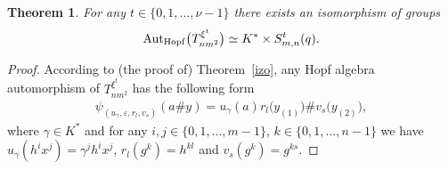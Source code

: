 \documentclass[pdftex]{sigma}
\numberwithin{equation}{section}
\newtheorem{Theorem}{Theorem}[section]
\begin{document}
\begin{Theorem}\label{graut} For any $t \in \{0, 1,\dots, \nu - 1\}$ there exists an isomorphism of groups
\begin{gather*}
{\rm Aut} _{\rm Hopf}\big(T_{nm^{2}}^ {\xi^{t}}\big) \simeq K^{*}\times S^{t}_{m, n}(q).
\end{gather*}
\end{Theorem}
\begin{proof} According to (the proof of) Theorem~\ref{izo}, any Hopf algebra automorphism of $T_{nm^{2}}^ {\xi^{t}}$ has the following form
\begin{gather*}
\psi_{(u_{\gamma}, \varepsilon, r_{l}, v_{s})}(a \# y) = u_{\gamma}(a) r_{l}\big(y_{(1)}\big) \# v_{s}\big(y_{(2)}\big),
\end{gather*}
where $\gamma \in K^{*}$ and for any $i, j \in \{0, 1,\dots, m-1\}$, $k \in \{0, 1,\dots, n-1\}$ we have $u_{\gamma}(h^{i}x^{j}) = \gamma^{j}h^{i}x^{j}$, $r_{l}(g^{k}) = h^{kl}$ and $v_{s}(g^{k}) = g^{ks}$.


\end{proof}
\end{document}

